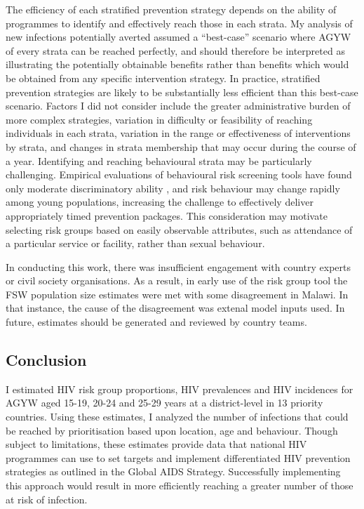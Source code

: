 \documentclass[a4paper, nobind]{templates/ociamthesis}
\begin{document}
The efficiency of each stratified prevention strategy depends on the ability of programmes to identify and effectively reach those in each strata.
My analysis of new infections potentially averted assumed a ``best-case'' scenario where AGYW of every strata can be reached perfectly, and should therefore be interpreted as illustrating the potentially obtainable benefits rather than benefits which would be obtained from any specific intervention strategy.
In practice, stratified prevention strategies are likely to be substantially less efficient than this best-case scenario.
Factors I did not consider include the greater administrative burden of more complex strategies, variation in difficulty or feasibility of reaching individuals in each strata, variation in the range or effectiveness of interventions by strata, and changes in strata membership that may occur during the course of a year.
Identifying and reaching behavioural strata may be particularly challenging.
Empirical evaluations of behavioural risk screening tools have found only moderate discriminatory ability \autocite{jia2022risk}, and risk behaviour may change rapidly among young populations, increasing the challenge to effectively deliver appropriately timed prevention packages.
This consideration may motivate selecting risk groups based on easily observable attributes, such as attendance of a particular service or facility, rather than sexual behaviour.

In conducting this work, there was insufficient engagement with country experts or civil society organisations.
As a result, in early use of the risk group tool the FSW population size estimates were met with some disagreement in Malawi.
In that instance, the cause of the disagreement was extenal model inputs used.
In future, estimates should be generated and reviewed by country teams.

\hypertarget{conclusion}{%
\subsection{Conclusion}\label{conclusion}}

I estimated HIV risk group proportions, HIV prevalences and HIV incidences for AGYW aged 15-19, 20-24 and 25-29 years at a district-level in 13 priority countries.
Using these estimates, I analyzed the number of infections that could be reached by prioritisation based upon location, age and behaviour.
Though subject to limitations, these estimates provide data that national HIV programmes can use to set targets and implement differentiated HIV prevention strategies as outlined in the Global AIDS Strategy.
Successfully implementing this approach would result in more efficiently reaching a greater number of those at risk of infection.
\end{document}
